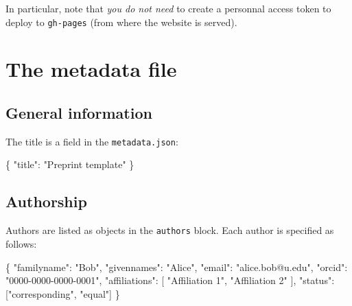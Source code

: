 \documentclass[10pt,oneside]{article}
\newenvironment{Shaded}{\begin{snugshade}}{\end{snugshade}}
\newcommand{\DataTypeTok}[1]{\textcolor[rgb]{0.13,0.29,0.53}{#1}}
\newcommand{\StringTok}[1]{\textcolor[rgb]{0.31,0.60,0.02}{#1}}
\newcommand{\OtherTok}[1]{\textcolor[rgb]{0.56,0.35,0.01}{#1}}
\newcommand{\FunctionTok}[1]{\textcolor[rgb]{0.00,0.00,0.00}{#1}}
\begin{document}
In particular, note that \emph{you do not need} to create a personnal
access token to deploy to \texttt{gh-pages} (from where the website is
served).

\hypertarget{the-metadata-file}{%
\section{The metadata file}\label{the-metadata-file}}

\hypertarget{general-information}{%
\subsection{General information}\label{general-information}}

The title is a field in the \texttt{metadata.json}:

\begin{Shaded}
\begin{Highlighting}[]
\FunctionTok{\{}
    \DataTypeTok{"title"}\FunctionTok{:} \StringTok{"Preprint template"}
\FunctionTok{\}}
\end{Highlighting}
\end{Shaded}

\hypertarget{authorship}{%
\subsection{Authorship}\label{authorship}}

Authors are listed as objects in the \texttt{authors} block. Each author
is specified as follows:

\begin{Shaded}
\begin{Highlighting}[]
\FunctionTok{\{}
      \DataTypeTok{"familyname"}\FunctionTok{:} \StringTok{"Bob"}\FunctionTok{,}
      \DataTypeTok{"givennames"}\FunctionTok{:} \StringTok{"Alice"}\FunctionTok{,}
      \DataTypeTok{"email"}\FunctionTok{:} \StringTok{"alice.bob@u.edu"}\FunctionTok{,}
      \DataTypeTok{"orcid"}\FunctionTok{:} \StringTok{"0000{-}0000{-}0000{-}0001"}\FunctionTok{,}
      \DataTypeTok{"affiliations"}\FunctionTok{:} \OtherTok{[}
        \StringTok{"Affiliation 1"}\OtherTok{,}
        \StringTok{"Affiliation 2"}
      \OtherTok{]}\FunctionTok{,}
      \DataTypeTok{"status"}\FunctionTok{:} \OtherTok{[}\StringTok{"corresponding"}\OtherTok{,} \StringTok{"equal"}\OtherTok{]}
    \FunctionTok{\}}
\end{Highlighting}
\end{Shaded}
\end{document}
